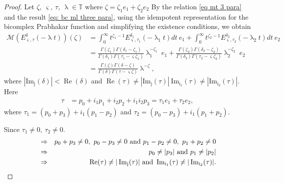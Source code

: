 \documentclass[a4paper,12pt]{article}
\theoremstyle{remark}
\begin{document}
\begin{proof}
	Let $\zeta,~ \varsigma,~\tau,~\uplambda  \in \mathds{T} $ where $\zeta=\zeta_1e_1+\zeta_2e_2$
By the  relation \eqref{eq mt 3 para} and the result \eqref{eq: bc ml three para}, using the idempotent representation for the bicomplex Prabhakar function and simplifying the existence conditions, we obtain
\begin{equation}\label{eq:bc lap 2ml}
\begin{split}
	\mathcal{M}(E_{ \varsigma,\tau}^\delta( -\uplambda t))(\zeta)
&=	\int_{0}^{\infty}t^{\zeta_1-1}E_{ \varsigma, \tau_1}^{\delta_1}(-\uplambda _1t)dt~e_1+\int_{0}^{\infty}t^{\zeta_2-1}E_{ \varsigma, \tau_2}^{\delta_2}(-\uplambda _2t)dt~e_2\\
&=\frac{\Gamma(\zeta_1)\Gamma(\delta_1-\zeta_1)}{\Gamma(\delta_1)\Gamma(\tau_1- \varsigma \zeta_1)}\uplambda _1^{-\zeta_1}~e_1+\frac{\Gamma(\zeta_2)\Gamma(\delta_2-\zeta_2)}{\Gamma(\delta_2)\Gamma(\tau_2- \varsigma \zeta_2)}\uplambda _2^{-\zeta_2}~e_2\\
&=\frac{\Gamma(\zeta)\Gamma(\delta-\zeta)}{\Gamma(\delta)\Gamma(\tau- \varsigma \zeta)}\uplambda ^{-\zeta},
	\end{split}
	\end{equation}
	where $|\operatorname{Im_j}(\delta)|<\operatorname{Re}(\delta)$ and
$\operatorname{Re}(\tau)\neq |\operatorname{Im_j}(\tau)|~ \operatorname{Im_{i_1}}(\tau)\neq |\operatorname{Im_{i_2}}(\tau)|.$\\
	Here
	\begin{equation}
	\begin{split}
	\tau &= p_0+i_1p_1+ i_2p_2+i_1i_2p_3
	=\tau_1e_1+\tau_2e_2,
	\end{split}
	\end{equation}
	where $\tau_1= (p_0+p_3) +i_1(p_1-p_2)$ and $\tau_2= (p_0-p_3) +i_1(p_1+p_2).$
	
\noindent	Since
$\tau_1\ne0,~\tau_2 \ne0.$
\begin{eqnarray}
&\Rightarrow & p_0+p_3 \neq 0, ~ p_0-p_3\neq 0~\text{and}~ p_1-p_2 \neq 0 ,~ p_1+p_2\neq 0 \notag\\
&	\Rightarrow& ~ p_0\neq |p_3|~\text{and}~ p_1\ne |p_2|\notag\\
&\Rightarrow& \operatorname{Re}(\tau)\neq |\operatorname{Im_j}(\tau)|~\text{and}~ \operatorname{Im_{i_1}}(\tau)\neq |\operatorname{Im_{i_2}}(\tau)|.
\end{eqnarray}


\end{proof}
\end{document}

